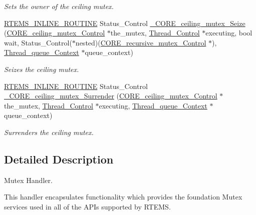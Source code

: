 \begin{DoxyCompactItemize}
\begin{DoxyCompactList}\small\item\em Sets the owner of the ceiling mutex. \end{DoxyCompactList}\item 
\mbox{\hyperlink{group__RTEMSScoreBaseDefs_gac216239df231d5dbd15e3520b0b9313f}{R\+T\+E\+M\+S\+\_\+\+I\+N\+L\+I\+N\+E\+\_\+\+R\+O\+U\+T\+I\+NE}} Status\+\_\+\+Control \mbox{\hyperlink{group__RTEMSScoreMutex_gae40030a2c780f0da5839deee9387f340}{\+\_\+\+C\+O\+R\+E\+\_\+ceiling\+\_\+mutex\+\_\+\+Seize}} (\mbox{\hyperlink{structCORE__ceiling__mutex__Control}{C\+O\+R\+E\+\_\+ceiling\+\_\+mutex\+\_\+\+Control}} $\ast$the\+\_\+mutex, \mbox{\hyperlink{struct__Thread__Control}{Thread\+\_\+\+Control}} $\ast$executing, bool wait, Status\+\_\+\+Control($\ast$nested)(\mbox{\hyperlink{structCORE__recursive__mutex__Control}{C\+O\+R\+E\+\_\+recursive\+\_\+mutex\+\_\+\+Control}} $\ast$), \mbox{\hyperlink{structThread__queue__Context}{Thread\+\_\+queue\+\_\+\+Context}} $\ast$queue\+\_\+context)
\begin{DoxyCompactList}\small\item\em Seizes the ceiling mutex. \end{DoxyCompactList}\item 
\mbox{\hyperlink{group__RTEMSScoreBaseDefs_gac216239df231d5dbd15e3520b0b9313f}{R\+T\+E\+M\+S\+\_\+\+I\+N\+L\+I\+N\+E\+\_\+\+R\+O\+U\+T\+I\+NE}} Status\+\_\+\+Control \mbox{\hyperlink{group__RTEMSScoreMutex_gac76286dab6594ca0499aa20861f69fb8}{\+\_\+\+C\+O\+R\+E\+\_\+ceiling\+\_\+mutex\+\_\+\+Surrender}} (\mbox{\hyperlink{structCORE__ceiling__mutex__Control}{C\+O\+R\+E\+\_\+ceiling\+\_\+mutex\+\_\+\+Control}} $\ast$the\+\_\+mutex, \mbox{\hyperlink{struct__Thread__Control}{Thread\+\_\+\+Control}} $\ast$executing, \mbox{\hyperlink{structThread__queue__Context}{Thread\+\_\+queue\+\_\+\+Context}} $\ast$queue\+\_\+context)
\begin{DoxyCompactList}\small\item\em Surrenders the ceiling mutex. \end{DoxyCompactList}\end{DoxyCompactItemize}


\subsection{Detailed Description}
Mutex Handler. 

This handler encapsulates functionality which provides the foundation Mutex services used in all of the A\+P\+Is supported by R\+T\+E\+MS. 

